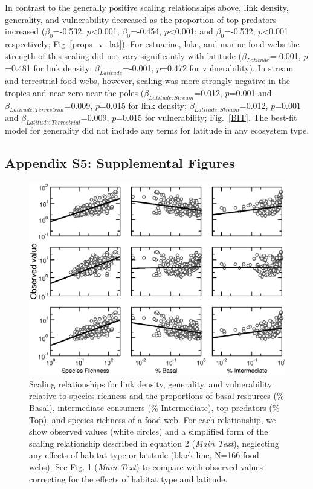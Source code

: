 \documentclass[12pt]{article}
\begin{document}
    In contrast to the generally positive scaling relationships above, link
    density, generality, and vulnerability decreased as the proportion of top
    predators increased ($\beta_0$=-0.532, $p$\textless0.001; $\beta_0$=-0.454,
    $p$\textless0.001; and $\beta_0$=-0.532, $p$\textless0.001 respectively;
    Fig~\ref{props_v_lat}). For estuarine, lake, and marine food webs the
    strength of this scaling did not vary significantly with latitude
    ($\beta_{Latitude}$=-0.001, $p$=0.481 for link density;
    $\beta_{Latitude}$=-0.001, $p$=0.472 for vulnerability).
    In stream and terrestrial food webs, however, scaling was more strongly negative in the 
    tropics and near zero near the poles ($\beta_{Latitude:Stream}$=0.012, $p$=0.001 
    and $\beta_{Latitude:Terrestrial}$=0.009, $p$=0.015 for link density;
    $\beta_{Latitude:Stream}$=0.012, $p$=0.001 and $\beta_{Latitude:Terrestrial}$=0.009, $p$=0.015
    for vulnerability; Fig.~\ref{BIT}. The best-fit model for generality did not include any terms
    for latitude in any ecosystem type.




\newpage

\subsection*{Appendix S5: Supplemental Figures}

\begin{figure}[h]
\centerline{\includegraphics*[width=.75\textwidth]{Figures/by_TL/scaling_with_S/proportions/fitlines_nonts_observed.eps}}
\caption{Scaling relationships for link density, generality, 
and vulnerability relative to species richness and the proportions of basal resources (\% Basal),
intermediate consumers (\% Intermediate), top predators (\% Top), and species richness of a food web. 
For each relationship, we show observed values (white circles) and 
a simplified form of the scaling relationship described in equation 2 (\emph{Main Text}), neglecting 
any effects of habitat type or latitude (black line, N=166 food webs). See Fig. 1 (\emph{Main Text}) to compare with 
observed values correcting for the effects of habitat type and latitude. }
\label{props_v_lat_obs}
\end{figure}
\end{document}
